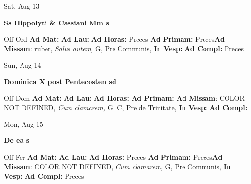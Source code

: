 \documentclass[10pt]{memoir}
\begin{document}
\begin{center}
\begin{minipage}{3.5in}
\vspace{2em}
\begin{center}Sat, Aug 13
\end{center}
\textbf{ \large Ss Hippolyti \& Cassiani Mm
\textnormal{\normalsize s}}

\begin{justify}Off Ord
\textbf{Ad Mat: }
\textbf{Ad Lau: }
\textbf{Ad Horas: }Preces
\textbf{Ad Primam: }Preces\textbf{Ad Missam}: ruber, \textit{Salus autem,} G, Pre Communis, 
\textbf{In Vesp: }
\textbf{Ad Compl: }Preces
\end{justify}
\end{minipage}
\end{center}

\begin{center}
\begin{minipage}{3.5in}
\vspace{2em}
\begin{center}Sun, Aug 14
\end{center}
\textbf{ \large Dominica X post Pentecosten
\textnormal{\normalsize sd}}

\begin{justify}Off Dom
\textbf{Ad Mat: }
\textbf{Ad Lau: }
\textbf{Ad Horas: }
\textbf{Ad Primam: }\textbf{Ad Missam}: COLOR NOT DEFINED, \textit{Cum clamarem,} G, C, Pre de Trinitate, 
\textbf{In Vesp: }
\textbf{Ad Compl: }
\end{justify}
\end{minipage}
\end{center}

\begin{center}
\begin{minipage}{3.5in}
\vspace{2em}
\begin{center}Mon, Aug 15
\end{center}
\textbf{ \large De ea
\textnormal{\normalsize s}}

\begin{justify}Off Fer
\textbf{Ad Mat: }
\textbf{Ad Lau: }
\textbf{Ad Horas: }Preces
\textbf{Ad Primam: }Preces\textbf{Ad Missam}: COLOR NOT DEFINED, \textit{Cum clamarem,} G, Pre Communis, 
\textbf{In Vesp: }
\textbf{Ad Compl: }Preces
\end{justify}
\end{minipage}
\end{center}
\end{document}

